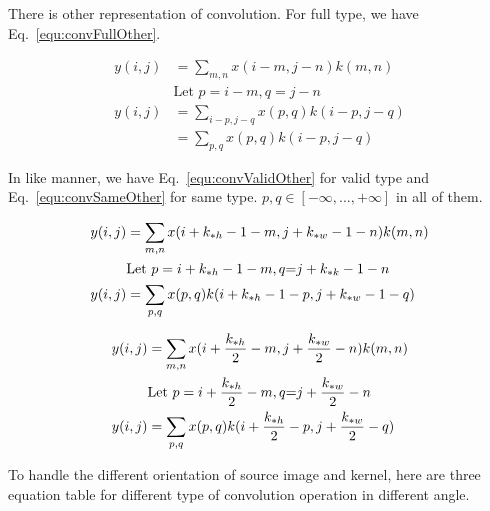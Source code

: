 \documentclass[runningheads,openany]{xhlPaper}
\begin{document}
There is other representation of convolution. For full type, we have Eq.~\ref{equ:convFullOther}. 

\begin{equation}
\label{equ:convFullOther}
\begin{aligned}
y(i,j) &= \sum\limits_{m,n} {x(i - m,j - n)k(m,n)} \\
&{\text{Let }p = i - m,q = j - n}\\
y(i,j) &= \sum\limits_{i - p,j - q} {x(p,q)k(i - p,j - q)}\\
 &= \sum\limits_{p,q} {x(p,q)k(i - p,j - q)} 
\end{aligned}
\end{equation}

In like manner, we have Eq.~\ref{equ:convValidOther} for valid type and Eq.~\ref{equ:convSameOther} for same type. $p, q \in [ -\infty,...,+\infty]$ in all of them.

\begin{equation}
\label{equ:convValidOther}
\begin{aligned}
y(i,j) &= \sum\limits_{m,n} {x(i + k_{*h} - 1 - m,j + k_{*w} - 1 - n)k(m,n)} \\
&{\text{Let }}p = i + k_{*h} - 1 - m,{\rm{ }}q{\rm{ =  }}j + k_{*k} - 1 - n\\
y(i,j) &= \sum\limits_{p,q} {x(p,q)k(i + k_{*h} - 1 - p,j + k_{*w} - 1 - q)} 
\end{aligned}
\end{equation}

\begin{equation}
\label{equ:convSameOther}
\begin{aligned}
y(i,j){\rm{ }} &= \sum\limits_{m,n} {x(i + \frac{k_{*h}}{2} - m,j + \frac{k_{*w}}{2} - n)k(m,n)} \\
&{\text{Let }}p = i + \frac{k_{*h}}{2} - m,{\rm{ }}q{\rm{ =  }}j + \frac{k_{*w}}{2} - n\\
y(i,j) &= \sum\limits_{p,q} {x(p,q)k(i + \frac{k_{*h}}{2} - p,j + \frac{k_{*w}}{2}  - q)} 
\end{aligned}
\end{equation}

To handle the different orientation of source image and kernel, here are three equation table for different type of convolution operation in different angle.
\end{document}
